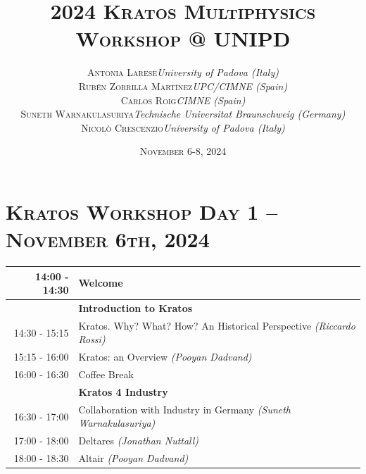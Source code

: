 \documentclass{article}
\begin{document}
\title{
   \Huge
   2024 \textsc{Kratos Multiphysics\\Workshop @ UNIPD}
}
\author{
   \small
   \begin{tabular}{rl}
      \textsc{Antonia Larese} & \textit{University of Padova (Italy)} \\
      \textsc{Rubén Zorrilla Martínez} & \textit{UPC/CIMNE (Spain)} \\
      \textsc{Carlos Roig} & \textit{CIMNE (Spain)} \\
      \textsc{Suneth Warnakulasuriya} & \textit{Technische Universitat Braunschweig (Germany)} \\
      \textsc{Nicol\`o Crescenzio} & \textit{University of Padova (Italy)}
   \end{tabular}
}
\date{\textsc{November} 6-8, 2024}
\maketitle

\renewcommand{\arraystretch}{1.5}

\section*{\centering\textsc{Kratos Workshop Day 1 -- November 6th, 2024}}

\begin{table}[h]\centering
   \begin{tabularx}{0.85\textwidth}{r|X}
      \toprule%
      14:00 - 14:30 & Welcome \\%
      \midrule%
                    & {\large \textbf{Introduction to Kratos}} \\%
      14:30 - 15:15 & Kratos. Why? What? How? An Historical Perspective \textit{(Riccardo Rossi)}\\%
      15:15 - 16:00 & Kratos: an Overview \textit{(Pooyan Dadvand)}\\%
      \midrule%
      \rowcolor{SeaGreen3!5!} 16:00 - 16:30 & Coffee Break \\%
      \midrule%
                    & {\large \textbf{Kratos 4 Industry}} \\%
      16:30 - 17:00 & Collaboration with Industry in Germany \textit{(Suneth Warnakulasuriya)}\\%
      17:00 - 18:00 & Deltares \textit{(Jonathan Nuttall)}\\%
      18:00 - 18:30 & Altair \textit{(Pooyan Dadvand)}\\%
      \bottomrule
   \end{tabularx}
\end{table}
\end{document}
